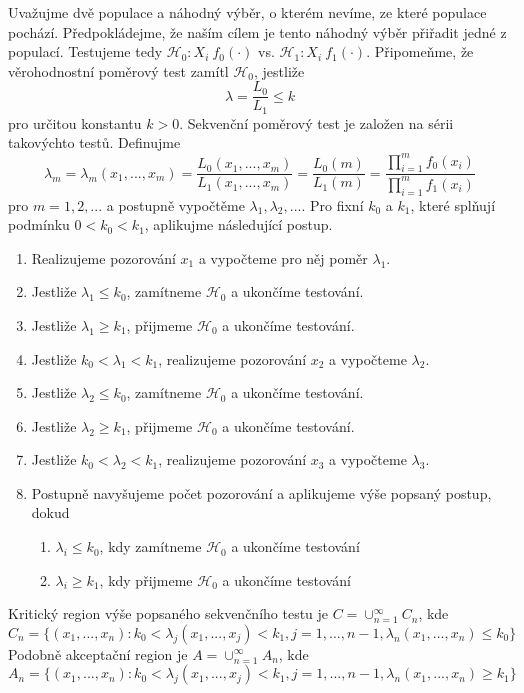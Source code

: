 Uvažujme dvě populace a náhodný výběr, o kterém nevíme, ze které populace pochází. Předpokládejme, že naším cílem je tento náhodný výběr přiřadit jedné z populací. Testujeme tedy $\mathscr{H}_0: X_i ~ f_0(\cdot)$ vs. $\mathscr{H}_1: X_i ~ f_1(\cdot)$. Připomeňme, že věrohodnostní poměrový test zamítl $\mathscr{H}_0$, jestliže
\begin{equation*}
\lambda = \frac{L_0}{L_1} \le k
\end{equation*}
pro určitou konstantu $k > 0$. Sekvenční poměrový test je založen na sérii takovýchto testů. Definujme
\begin{equation*}
\lambda_m = \lambda_m(x_1, ..., x_m) = \frac{L_0(x_1, ..., x_m)}{L_1(x_1, ..., x_m)} = \frac{L_0(m)}{L_1(m)} = \frac{\prod_{i = 1}^m f_0(x_i)}{\prod_{i = 1}^m f_1(x_i)}
\end{equation*}
pro $m = 1, 2 , ...$ a postupně vypočtěme $\lambda_1, \lambda_2, ...$. Pro fixní $k_0$ a $k_1$, které splňují podmínku $0 < k_0 < k_1$, aplikujme následující postup.
\begin{enumerate}
\item Realizujeme pozorování $x_1$ a vypočteme pro něj poměr $\lambda_1$.
\item Jestliže $\lambda_1 \le k_0$, zamítneme $\mathscr{H}_0$ a ukončíme testování.
\item Jestliže $\lambda_1 \ge k_1$, přijmeme $\mathscr{H}_0$ a ukončíme testování.
\item Jestliže $k_0 < \lambda_1 < k_1$, realizujeme pozorování $x_2$ a vypočteme $\lambda_2$.
\item Jestliže $\lambda_2 \le k_0$, zamítneme $\mathscr{H}_0$ a ukončíme testování.
\item Jestliže $\lambda_2 \ge k_1$, přijmeme $\mathscr{H}_0$ a ukončíme testování.
\item Jestliže $k_0 < \lambda_2 < k_1$, realizujeme pozorování $x_3$ a vypočteme $\lambda_3$.
\item Postupně navyšujeme počet pozorování a aplikujeme výše popsaný postup, dokud
\begin{enumerate}
\item $\lambda_i \le k_0$, kdy zamítneme $\mathscr{H}_0$ a ukončíme testování
\item $\lambda_i \ge k_1$, kdy přijmeme $\mathscr{H}_0$ a ukončíme testování
\end{enumerate}
\end{enumerate}
Kritický region výše popsaného sekvenčního testu je $C = \cup_{n = 1}^{\infty}C_n$, kde
\begin{equation*}
C_n = \{(x_1, ..., x_n): k_0 < \lambda_j(x_1, ..., x_j) < k_1, j = 1, ..., n -1, \lambda_n(x_1, ..., x_n) \le k_0\}
\end{equation*}
Podobně akceptační region je $A = \cup_{n = 1}^{\infty} A_n$, kde
\begin{equation*}
A_n = \{(x_1, ..., x_n): k_0 < \lambda_j(x_1, ..., x_j) < k_1, j = 1, ..., n - 1, \lambda_n(x_1, ..., x_n) \ge k_1\}
\end{equation*}

